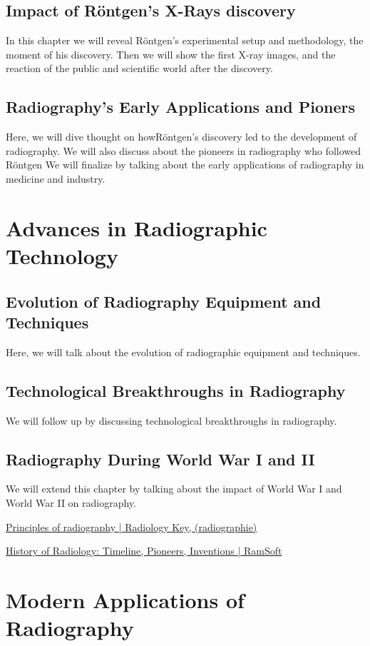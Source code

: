 \documentclass[a4paper,12pt]{report}
\begin{document}
\section{Impact of Röntgen's X-Rays discovery}
In this chapter we will reveal Röntgen's experimental setup and methodology, the moment of his discovery. Then we will show the first X-ray images, and the reaction of the public and scientific world after the discovery.
\section{Radiography's Early Applications and Pioners}
Here, we will dive thought on howRöntgen's discovery led to the development of radiography. We will also discuss about the pioneers in radiography who followed Röntgen We will finalize by talking about the early applications of radiography in medicine and industry.

\chapter{Advances  in Radiographic Technology}
\section{Evolution of Radiography Equipment and Techniques}
Here, we will talk about the evolution of radiographic equipment and techniques. 
\section{	Technological Breakthroughs in Radiography}
We will follow up by discussing technological breakthroughs in radiography. 
\section{Radiography During World War I and II}
We will extend this chapter by talking about the impact of World War I and World War II on radiography. 

\href{https://radiologykey.com/principles-of-radiography/}{Principles of radiography | Radiology Key, (radiographie) }

\href{https://www.ramsoft.com/history-of-radiology/}{History of Radiology: Timeline, Pioneers, Inventions | RamSoft  }

\chapter{Modern Applications of Radiography}
\end{document}
